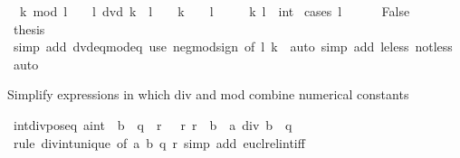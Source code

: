 \begin{isabellebody}
\ \ {\isachardoublequoteopen}k\ mod\ l\ {\isasymge}\ {}\ {\isasymlongleftrightarrow}\ l\ dvd\ k\ {\isasymor}\ l\ {\isacharequal}{\kern0pt}\ {}\ {\isasymand}\ k\ {\isasymge}\ {}\ {\isasymor}\ l\ {\isachargreater}{\kern0pt}\ {}{\isachardoublequoteclose}\isanewline
\ \ \ k\ l\ {\isacharcolon}{\kern0pt}{\isacharcolon}{\kern0pt}\ int\isanewline
%
\isadelimproof
%
\endisadelimproof
%
\isatagproof
{}\isamarkupfalse%
\ {\isacharparenleft}{\kern0pt}cases\ {\isachardoublequoteopen}l\ {\isachargreater}{\kern0pt}\ {}{\isachardoublequoteclose}{\isacharparenright}{\kern0pt}\isanewline
\ \ \isamarkupfalse%
\ False\isanewline
\ \ \isamarkupfalse%
\ \isamarkupfalse%
\ {\isacharquery}{\kern0pt}thesis\ \isanewline
\ \ \ \ \isamarkupfalse%
\ {\isacharparenleft}{\kern0pt}simp\ add{\isacharcolon}{\kern0pt}\ dvd{\isacharunderscore}{\kern0pt}eq{\isacharunderscore}{\kern0pt}mod{\isacharunderscore}{\kern0pt}eq{\isacharunderscore}{\kern0pt}{}{\isacharparenright}{\kern0pt}\ {\isacharparenleft}{\kern0pt}use\ neg{\isacharunderscore}{\kern0pt}mod{\isacharunderscore}{\kern0pt}sign\ {\isacharbrackleft}{\kern0pt}of\ l\ k{\isacharbrackright}{\kern0pt}\ \ {\isacartoucheopen}auto\ simp\ add{\isacharcolon}{\kern0pt}\ le{\isacharunderscore}{\kern0pt}less\ not{\isacharunderscore}{\kern0pt}less{\isacartoucheclose}{\isacharparenright}{\kern0pt}\isanewline
{}\isamarkupfalse%
\ auto%
\endisatagproof
{\isafoldproof}%
%
\isadelimproof
%
\endisadelimproof
%
\begin{isamarkuptext}%
Simplify expressions in which div and mod combine numerical constants%
\end{isamarkuptext}\isamarkuptrue%
\isamarkupfalse%
\ int{\isacharunderscore}{\kern0pt}div{\isacharunderscore}{\kern0pt}pos{\isacharunderscore}{\kern0pt}eq{\isacharcolon}{\kern0pt}\ {\isachardoublequoteopen}{\isasymlbrakk}{\isacharparenleft}{\kern0pt}a{\isacharcolon}{\kern0pt}{\isacharcolon}{\kern0pt}int{\isacharparenright}{\kern0pt}\ {\isacharequal}{\kern0pt}\ b\ {\isacharasterisk}{\kern0pt}\ q\ {\isacharplus}{\kern0pt}\ r{\isacharsemicolon}{\kern0pt}\ {}\ {\isasymle}\ r{\isacharsemicolon}{\kern0pt}\ r\ {\isacharless}{\kern0pt}\ b{\isasymrbrakk}\ {\isasymLongrightarrow}\ a\ div\ b\ {\isacharequal}{\kern0pt}\ q{\isachardoublequoteclose}\isanewline
%
\isadelimproof
\ \ %
\endisadelimproof
%
\isatagproof
{}\isamarkupfalse%
\ {\isacharparenleft}{\kern0pt}rule\ div{\isacharunderscore}{\kern0pt}int{\isacharunderscore}{\kern0pt}unique\ {\isacharbrackleft}{\kern0pt}of\ a\ b\ q\ r{\isacharbrackright}{\kern0pt}{\isacharparenright}{\kern0pt}\ {\isacharparenleft}{\kern0pt}simp\ add{\isacharcolon}{\kern0pt}\ eucl{\isacharunderscore}{\kern0pt}rel{\isacharunderscore}{\kern0pt}int{\isacharunderscore}{\kern0pt}iff{\isacharparenright}{\kern0pt}%

\end{isabellebody}
